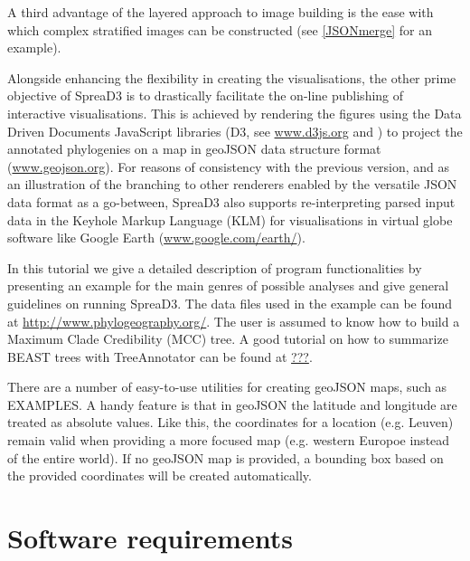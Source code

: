 \documentclass[english]{paper}
\begin{document}
A third advantage of the layered approach to image building is the ease with which complex stratified images can be constructed (see \ref{JSONmerge} for an example). 
\par
Alongside enhancing the flexibility in creating the visualisations, the other prime objective of SpreaD3 is to drastically facilitate the on-line publishing of interactive visualisations.
This is achieved by rendering the figures using the Data Driven Documents JavaScript libraries (D3, see \url{www.d3js.org} and \citet{Bostock:2011aa}) to project the annotated phylogenies on a map in geoJSON data structure format (\url{www.geojson.org}).
For reasons of consistency with the previous version, and as an illustration of the branching to other renderers enabled by the versatile JSON data format as a go-between, SpreaD3 also supports re-interpreting parsed input data in the Keyhole Markup Language (KLM) for visualisations in virtual globe software like Google Earth (\url{www.google.com/earth/}). 
\par
In this tutorial we give a detailed description of program functionalities by presenting an example for the main genres of possible analyses and give general guidelines on running SpreaD3. 
The data files used in the example can be found at \url{http://www.phylogeography.org/}.
The user is assumed to know how to build a Maximum Clade Credibility (MCC) tree. 
A good tutorial on how to summarize BEAST trees with TreeAnnotator can be found at \url{???}.
\par
There are a number of easy-to-use utilities for creating geoJSON maps, such as EXAMPLES. %
A handy feature is that in geoJSON the latitude and longitude are treated as absolute values.
Like this, the coordinates for a location (e.g. Leuven) remain valid when providing a more focused map (e.g. western Europoe instead of the entire world).
If no geoJSON map is provided, a bounding box based on the provided coordinates will be created automatically.


\section{Software requirements}
\end{document}
